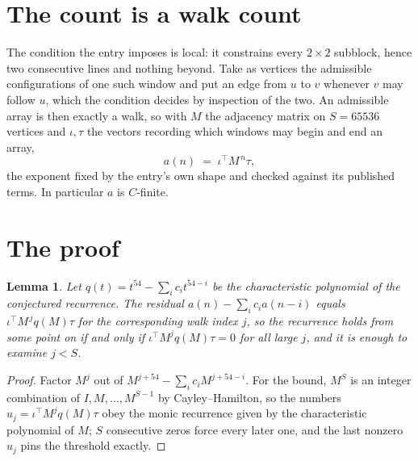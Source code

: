\documentclass[11pt,a4paper]{article}
\theoremstyle{plain}
\newtheorem{lemma}[theorem]{Lemma}
\theoremstyle{definition}
\begin{document}
\section{The count is a walk count}

The condition the entry imposes is local: it constrains every $2\times2$ subblock, hence two consecutive lines and nothing beyond. Take as
vertices the admissible configurations of one such window and put an edge from $u$ to $v$
whenever $v$ may follow $u$, which the condition decides by inspection of the two. An
admissible array is then exactly a walk, so with $M$ the adjacency matrix on $S=65536$ vertices
and $\iota,\tau$ the vectors recording which windows may begin and end an array,
\[
a(n)\;=\;\iota^{\!\top}M^{\,n}\tau ,
\]
the exponent fixed by the entry's own shape and checked against its published terms. In
particular $a$ is $C$-finite.

\section{The proof}

\begin{lemma}\label{lem:crit}
Let $q(t)=t^{54}-\sum_i c_it^{54-i}$ be the characteristic polynomial of the
conjectured recurrence. The residual $a(n)-\sum_ic_ia(n-i)$ equals
$\iota^{\!\top}M^{\,j}q(M)\tau$ for the corresponding walk index $j$, so the recurrence
holds from some point on if and only if $\iota^{\!\top}M^{j}q(M)\tau=0$ for all large $j$,
and it is enough to examine $j<S$.
\end{lemma}

\begin{proof}
Factor $M^{j}$ out of $M^{j+54}-\sum_ic_iM^{j+54-i}$. For the bound, $M^{S}$
is an integer combination of $I,M,\dots,M^{S-1}$ by Cayley--Hamilton, so the numbers
$u_j=\iota^{\!\top}M^{j}q(M)\tau$ obey the monic recurrence given by the characteristic
polynomial of $M$; $S$ consecutive zeros force every later one, and the last nonzero $u_j$
pins the threshold exactly.
\end{proof}
\end{document}

